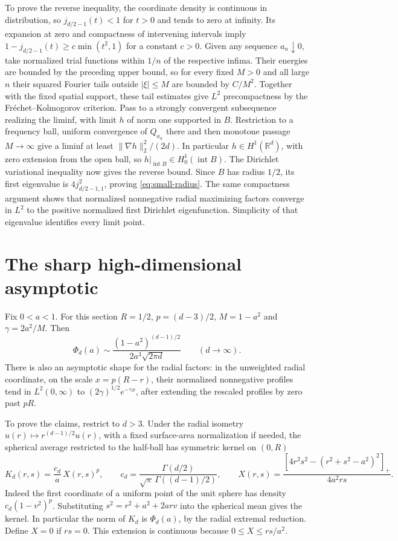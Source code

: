 \documentclass[11pt,a4paper]{article}
\numberwithin{equation}{section}
\begin{document}
To prove the reverse inequality, the coordinate density is continuous in distribution, so $j_{d/2-1}(t)<1$ for $t>0$ and tends to zero at infinity. Its expansion at zero and compactness of intervening intervals imply $1-j_{d/2-1}(t)\ge c\min(t^2,1)$ for a constant $c>0$. Given any sequence $a_n\downarrow0$, take normalized trial functions within $1/n$ of the respective infima. Their energies are bounded by the preceding upper bound, so for every fixed $M>0$ and all large $n$ their squared Fourier tails outside $|\xi|\le M$ are bounded by $C/M^2$. Together with the fixed spatial support, these tail estimates give $L^2$ precompactness by the Fr\'echet--Kolmogorov criterion. Pass to a strongly convergent subsequence realizing the liminf, with limit $h$ of norm one supported in $B$. Restriction to a frequency ball, uniform convergence of $Q_{a_n}$ there and then monotone passage $M\to\infty$ give a liminf at least $\|\nabla h\|_2^2/(2d)$. In particular $h\in H^1(\mathbb R^d)$, with zero extension from the open ball, so $h|_{\operatorname{int} B}\in H_0^1(\operatorname{int} B)$. The Dirichlet variational inequality now gives the reverse bound. Since $B$ has radius $1/2$, its first eigenvalue is $4j_{d/2-1,1}^2$, proving \eqref{eq:small-radius}. The same compactness argument shows that normalized nonnegative radial maximizing factors converge in $L^2$ to the positive normalized first Dirichlet eigenfunction. Simplicity of that eigenvalue identifies every limit point.

\section{The sharp high-dimensional asymptotic}
\label{sec:ef-high-d}
Fix $0<a<1$. For this section $R=1/2$, $p=(d-3)/2$, $M=1-a^2$ and $\gamma=2a^2/M$. Then
\begin{equation}\label{eq:ef-high-d}
 \Phi_d(a)\sim \frac{(1-a^2)^{(d-1)/2}}{2a^3\sqrt{2\pi d}}
 \qquad(d\longrightarrow\infty).
\end{equation}
There is also an asymptotic shape for the radial factors: in the unweighted radial coordinate, on the scale $x=p(R-r)$, their normalized nonnegative profiles tend in $L^2(0,\infty)$ to $(2\gamma)^{1/2}e^{-\gamma x}$, after extending the rescaled profiles by zero past $pR$.

To prove the claims, restrict to $d>3$. Under the radial isometry $u(r)\mapsto r^{(d-1)/2}u(r)$, with a fixed surface-area normalization if needed, the spherical average restricted to the half-ball has symmetric kernel on $(0,R)$
\begin{equation}\label{eq:trianglekernel}
 K_d(r,s)=\frac{c_d}{a}\, X(r,s)^p,\qquad c_d=\frac{\Gamma(d/2)}{\sqrt\pi\,\Gamma((d-1)/2)},\qquad
 X(r,s)=\frac{[4r^2s^2-(r^2+s^2-a^2)^2]_+}{4a^2rs}.
\end{equation}
Indeed the first coordinate of a uniform point of the unit sphere has density $c_d(1-v^2)^p$. Substituting $s^2=r^2+a^2+2arv$ into the spherical mean gives the kernel. In particular the norm of $K_d$ is $\Phi_d(a)$, by the radial extremal reduction. Define $X=0$ if $rs=0$. This extension is continuous because $0\le X\le rs/a^2$.
\end{document}
